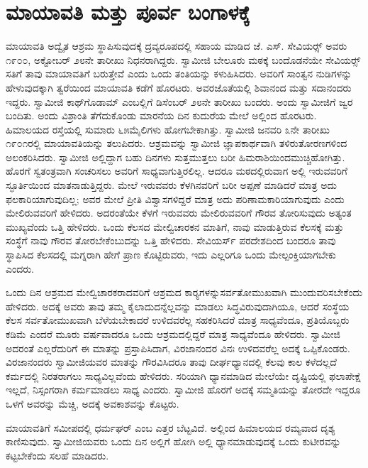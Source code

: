 
\chapter{ಮಾಯಾವತಿ ಮತ್ತು ಪೂರ್ವ ಬಂಗಾಳಕ್ಕೆ }

 ಮಾಯಾವತಿ ಅದ್ವೈತ ಆಶ್ರಮ ಸ್ಥಾಪಿಸುವುದಕ್ಕೆ ದ್ರವ್ಯರೂಪದಲ್ಲಿ ಸಹಾಯ ಮಾಡಿದ ಜೆ. ಎಸ್. ಸೇವಿಯರ್ಸ್‍‍ ಅವರು ೧೯೦೦, ಅಕ್ಟೋಬರ್ ೨೮ನೇ ತಾರೀಖು ನಿಧನರಾಗಿದ್ದರು. ಸ್ವಾಮೀಜಿ ಬೇಲೂರು ಮಠಕ್ಕೆ ಬಂದೊಡನೆಯೇ ಸೇವಿಯರ್ಸ್‍‍ ಸತಿಗೆ ತಾವು ಮಾಯಾವತಿಗೆ ಬರುತ್ತೇವೆ ಎಂದು ಒಂದು ತಂತಿಯನ್ನು ಕಳುಹಿಸಿದರು. ಅವರಿಗೆ ಸಾಂತ್ವನ ನುಡಿಗಳನ್ನು ಹೇಳುವುದಕ್ಕಾಗಿ ತ್ವರೆಯಿಂದ ಮಾಯಾವತಿ ಕಡೆಗೆ ಹೊರಟರು. ಅವರ\break ಜೊತೆಯಲ್ಲಿ ಶಿವಾನಂದ ಮತ್ತು ಸದಾನಂದರು ಇದ್ದರು. ಸ್ವಾಮೀಜಿ ಕಾಥ್‍ಗೊಡಾಮ್ ಎಂಬಲ್ಲಿಗೆ ಡಿಸೆಂಬರ್ ೨೮ನೇ ತಾರೀಖು ಬಂದರು. ಅಂದು ಸ್ವಾಮೀಜಿಗೆ ಜ್ವರ ಬಂದಿತು. ಅಂದು ವಿಶ್ರಾಂತಿ ತೆಗೆದುಕೊಂಡು ಮಾರನೆಯ ದಿನ ಕುದುರೆಯ ಮೇಲೆ ಅಲ್ಲಿಂದ ಹೊರಟರು. ಹಿಮಾಲಯದ ರಸ್ತೆಯಲ್ಲಿ ಸುಮಾರು ೬೫ಮೈಲಿಗಳು ಹೋಗಬೇಕಾಗಿತ್ತು. ಸ್ವಾಮೀಜಿ ಜನವರಿ ೩ನೇ ತಾರೀಖು ೧೯೦೧ರಲ್ಲಿ ಮಾಯಾವತಿಯನ್ನು ತಲುಪಿದರು. ಆಶ್ರಮವನ್ನು ಸ್ವಾಮೀಜಿ ಜ್ಞಾಪಕಾರ್ಥವಾಗಿ ತಳಿರುತೋರಣಗಳಿಂದ ಅಲಂಕರಿಸಿದರು. ಸ್ವಾಮೀಜಿ ಅಲ್ಲಿದ್ದಾಗ ಬಹು ದಿನಗಳು ಸುತ್ತಮುತ್ತಲು ಬರೀ ಹಿಮರಾಶಿಯಿಂದ\break ಮುಚ್ಚಿಹೋಗಿತ್ತು. ಹೊರಗೆ ಸ್ವತಂತ್ರವಾಗಿ ಸಂಚರಿಸಲು ಅವರಿಗೆ ಸಾಧ್ಯವಾಗುತ್ತಿರಲಿಲ್ಲ. ಆದರೂ ಮಠದಲ್ಲಿರುವಾಗ ಅಲ್ಲಿ ಇರುವವರಿಗೆ ಸ್ಫೂರ್ತಿಯಿಂದ ಮಾತನಾಡುತ್ತಿದ್ದರು. ಮೇಲೆ ಇರುವವರು ಕೆಳಗಿನವರಿಗೆ ಬರೀ ಅಪ್ಪಣೆ ಮಾಡಿದರೆ ಮಾತ್ರ ಅದು ಫಲಕಾರಿಯಾಗುವುದಿಲ್ಲ; ಅವರ ಮೇಲೆ ಪ್ರೀತಿ ವಿಶ್ವಾಸಗಳಿದ್ದರೆ ಮಾತ್ರ ಅದು ಪರಿಣಾಮಕಾರಿಯಾಗುವುದು ಎಂದು ಮೇಲಿರುವವರಿಗೆ ಹೇಳಿದರು. ಅದರಂತೆಯೇ ಕೆಳಗೆ ಇರುವವರು ಮೇಲಿರುವವರಿಗೆ ಗೌರವ ತೋರಿಸುವುದು ಅತ್ಯಂತ ಮುಖ್ಯವೆಂದು ಒತ್ತಿ ಹೇಳಿದರು. ಒಂದು ಕೆಲಸದ ಮೇಲ್ವಿಚಾರಕನ ಮಾತಿಗೆ, ನಾವು ಮಾಡುತ್ತಿರುವ ಕೆಲಸಕ್ಕೆ ಮತ್ತು ಸಂಸ್ಥೆಗೆ ನಾವು ಗೌರವ ತೋರಬೇಕೆಂಬುದನ್ನು ಒತ್ತಿ ಹೇಳಿದರು. ಸೇವಿಯರ್ಸ್ ಪರದೇಶದಿಂದ ಬಂದರೂ ತಾವು ಸ್ಥಾಪಿಸಿದ ಕೆಲಸದಲ್ಲಿ ಮಗ್ನರಾಗಿ ಹೇಗೆ ಪ್ರಾಣ ಕೊಟ್ಟಿರುವರು, ಇದು ಎಲ್ಲರಿಗೂ ಒಂದು ಮೇಲ್ಪಂಕ್ತಿಯಾಗಬೇಕು ಎಂದರು. 

 ಒಂದು ದಿನ ಆಶ್ರಮದ ಮೇಲ್ವಿಚಾರಕರಾದವರಿಗೆ ಆಶ್ರಮದ ಕಾರ‍್ಯ‍ಗಳನ್ನು\break ಸರ್ವತೋಮುಖವಾಗಿ ಮುಂದುವರಿಸಬೇಕೆಂದು ಹೇಳಿದರು. ಅದಕ್ಕೆ ಅವರು ತಾವು ತಮ್ಮ ಕೈಲಾದುದನ್ನೆಲ್ಲವನ್ನು ಮಾಡಲು ಸಿದ್ಧವಿರುವುದಾಗಿಯೂ, ಆದರೆ ಸಂಸ್ಥೆಯ ಕೆಲಸ ಸರ್ವತೋಮುಖವಾಗಿ ಬೆಳೆಯಬೇಕಾದರೆ ಉಳಿದವರೆಲ್ಲ ಸಹಕರಿಸಿದರೆ ಮಾತ್ರ ಸಾಧ್ಯವೆಂದೂ, ಪ್ರತಿಯೊಬ್ಬರು ಕಡಿಮೆ ಎಂದರೆ ಮೂರು ವರ್ಷವಾದರೂ ಒಂದು ಆಶ್ರಮದಲ್ಲಿದ್ದರೆ ಮಾತ್ರ ಸಾಧ್ಯವೆಂದೂ ಹೇಳಿದರು. ಸ್ವಾಮೀಜಿ ಅದರಂತೆ ಎಲ್ಲರೆದುರಿಗೆ ಈ ಮಾತನ್ನು ಪ್ರಸ್ತಾಪಿಸಿದಾಗ, ವಿರಜಾನಂದರ ವಿನಃ ಉಳಿದವರೆಲ್ಲ ಅದಕ್ಕೆ ಒಪ್ಪಿಕೊಂಡರು. ವಿರಜಾನಂದರು ಸ್ವಾಮೀಜಿಯವರ ಮಾತನ್ನು ಗೌರವಿಸಿದರೂ ತಾವು ದೀರ್ಘಧ್ಯಾನದಲ್ಲಿ ಕೆಲವು ಕಾಲ ಕಳೆದಲ್ಲದೆ ಕರ್ಮದಲ್ಲಿ ನಿರತರಾಗಲು ಸಾಧ್ಯವಿಲ್ಲವೆಂದು ಹೇಳಿದರು. ಸರಿಯಾಗಿ ಧ್ಯಾನಮಾಡಿದ ಮೇಲೆಯೇ ದೃಷ್ಟಿಯಲ್ಲಿ ಫಲಾಪೇಕ್ಷೆ ಇಲ್ಲದೆ, ನಿಸ್ಸಂಗರಾಗಿ ಕರ್ಮಮಾಡಲು ಸಾಧ್ಯ ಎಂದರು. ಸ್ವಾಮೀಜಿ ಹೊರಗೆ ಅದಕ್ಕೆ ಸಮ್ಮತಿಯನ್ನು ತೋರದೇ ಇದ್ದರೂ ಒಳಗೆ ಅವರನ್ನು ಮೆಚ್ಚಿ, ಅದಕ್ಕೆ ಅವಕಾಶವನ್ನು ಕೊಟ್ಟರು. 

 ಮಾಯಾವತಿಗೆ ಸಮೀಪದಲ್ಲಿ ಧರ್ಮಘರ್ ಎಂಬ ಎತ್ತರ ಬೆಟ್ಟವಿದೆ. ಅಲ್ಲಿಂದ ಹಿಮಾಲಯದ ರಮ್ಯವಾದ ದೃಶ್ಯ ಕಾಣಿಸುವುದು. ಸ್ವಾಮೀಜಿಯವರು ಒಂದು ದಿನ ಅಲ್ಲಿಗೆ ಹೋಗಿ ಅಲ್ಲಿ ಧ್ಯಾನಮಾಡುವುದಕ್ಕೆ ಒಂದು ಕುಟೀರವನ್ನು ಕಟ್ಟಬೇಕೆಂದು ಸಲಹೆ ಮಾಡಿದರು. 

